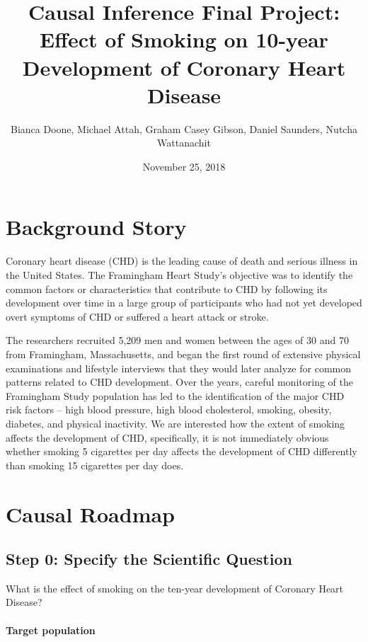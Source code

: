\documentclass[]{article}
\title{Causal Inference Final Project: Effect of Smoking on 10-year Development
of Coronary Heart Disease}
\author{Bianca Doone, Michael Attah, Graham Casey Gibson, Daniel Saunders,
Nutcha Wattanachit}
\date{November 25, 2018}
\let\oldparagraph\paragraph
\renewcommand{\paragraph}[1]{\oldparagraph{#1}\mbox{}}
\begin{document}
\maketitle

\hypertarget{background-story}{%
\section{Background Story}\label{background-story}}

Coronary heart disease (CHD) is the leading cause of death and serious
illness in the United States. The Framingham Heart Study's objective was
to identify the common factors or characteristics that contribute to CHD
by following its development over time in a large group of participants
who had not yet developed overt symptoms of CHD or suffered a heart
attack or stroke.

The researchers recruited 5,209 men and women between the ages of 30 and
70 from Framingham, Massachusetts, and began the first round of
extensive physical examinations and lifestyle interviews that they would
later analyze for common patterns related to CHD development. Over the
years, careful monitoring of the Framingham Study population has led to
the identification of the major CHD risk factors -- high blood pressure,
high blood cholesterol, smoking, obesity, diabetes, and physical
inactivity. We are interested how the extent of smoking affects the
development of CHD, specifically, it is not immediately obvious whether
smoking 5 cigarettes per day affects the development of CHD differently
than smoking 15 cigarettes per day does.

\hypertarget{causal-roadmap}{%
\section{Causal Roadmap}\label{causal-roadmap}}

\hypertarget{step-0-specify-the-scientific-question}{%
\subsection{Step 0: Specify the Scientific
Question}\label{step-0-specify-the-scientific-question}}

What is the effect of smoking on the ten-year development of Coronary
Heart Disease?

\hypertarget{target-population}{%
\paragraph{Target population}\label{target-population}}
\end{document}
